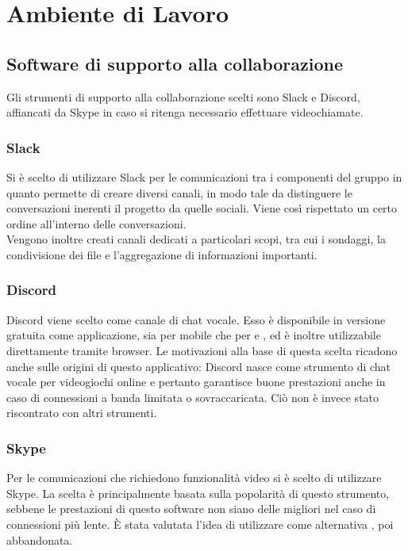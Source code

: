\section{Ambiente di Lavoro}

\subsection{Software di supporto alla collaborazione}
Gli strumenti di supporto alla collaborazione scelti sono Slack e Discord, affiancati da Skype in caso si ritenga necessario effettuare videochiamate.

\subsubsection{Slack}
Si è scelto di utilizzare Slack per le comunicazioni tra i componenti del gruppo in quanto permette di creare diversi canali, in modo tale da distinguere le conversazioni inerenti il progetto da quelle sociali. Viene così rispettato un certo ordine all'interno delle conversazioni.\\
Vengono inoltre creati canali dedicati a particolari scopi, tra cui i sondaggi, la condivisione dei file e l'aggregazione di informazioni importanti.

\subsubsection{Discord}
Discord viene scelto come canale di chat vocale. Esso è disponibile in versione gratuita come applicazione, sia per mobile che per  e , ed è inoltre utilizzabile direttamente tramite browser. Le motivazioni alla base di questa scelta ricadono anche sulle origini di questo applicativo: Discord nasce come strumento di chat vocale per videogiochi online e pertanto garantisce buone prestazioni anche in caso di connessioni a banda limitata o sovraccaricata. Ciò non è invece stato riscontrato con altri strumenti.

\subsubsection{Skype}
Per le comunicazioni che richiedono funzionalità video si è scelto di utilizzare Skype. La scelta è principalmente basata sulla popolarità di questo strumento, sebbene le prestazioni di questo software non siano delle migliori nel caso di connessioni più lente. \`{E} stata valutata l'idea di utilizzare come alternativa , poi abbandonata.

